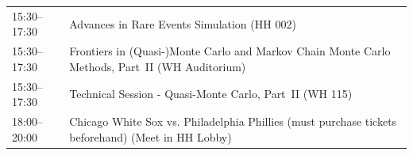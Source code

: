 \begin{table}
{\begin{tabularx}{\textwidth}{>{\hsize=0.32\hsize}X|>{\hsize=1.7\hsize}X}
\cellcolor{\SessionTitleColor}15:30--17:30 & \cellcolor{\SessionTitleColor}Advances in Rare Events Simulation (HH 002) \\
\cellcolor{\SessionTitleColor}15:30--17:30 & \cellcolor{\SessionTitleColor}Frontiers in (Quasi-)Monte Carlo and Markov Chain Monte Carlo Methods, Part~II (WH Auditorium) \\
\cellcolor{\SessionLightColor}15:30--17:30 & \cellcolor{\SessionLightColor}Technical Session - Quasi-Monte Carlo, Part~II (WH 115) \\
\cellcolor{\SessionTitleColor}18:00--20:00 & \cellcolor{\SessionTitleColor}Chicago White Sox vs. Philadelphia Phillies (must purchase tickets beforehand) (Meet in HH Lobby) \\
\hline
\end{tabularx}
}
\end{table}

